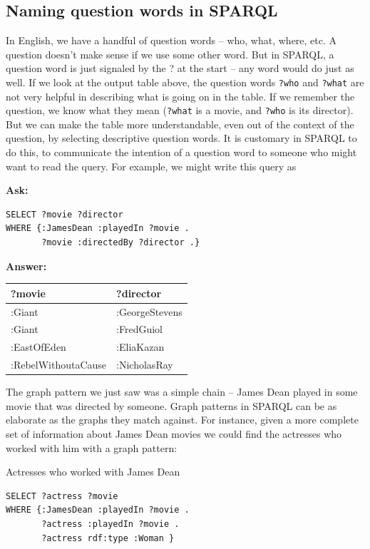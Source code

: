 \subsection{Naming question words in SPARQL}

In English, we have a handful of question words -- who, what, where,
etc. A question doesn't make sense if we use some other word. But in
SPARQL, a question word is just signaled by the ? at the start -- any
word would do just as well. If we look at the output table above, the
question words \texttt{?who} and \texttt{?what} are not very helpful in describing what is
going on in the table. If we remember the question, we know what they
mean (\texttt{?what} is a movie, and \texttt{?who} is its director). But we can make the
table more understandable, even out of the context of the question, by
selecting descriptive question words. It is customary in SPARQL to do
this, to communicate the intention of a question word to someone who
might want to read the query. For example, we might write this query as

\textbf{\textbf{Ask:}}

\begin{lstlisting}
SELECT ?movie ?director
WHERE {:JamesDean :playedIn ?movie .
       ?movie :directedBy ?director .}
\end{lstlisting}

\textbf{\textbf{Answer:}}

\begin{tabular}{|ll|}
\hline
?movie&?director\\
\hline
:Giant&:GeorgeStevens\\
:Giant&:FredGuiol\\
:EastOfEden&:EliaKazan\\
:RebelWithoutaCause&:NicholasRay\\
\hline
\end{tabular}

The graph pattern we just saw was a simple chain -- James Dean played in
some movie that was directed by someone. Graph patterns in SPARQL can be
as elaborate as the graphs they match against. For instance, given a
more complete set of information about James Dean movies we could find
the actresses who worked with him with a graph pattern:

\begin{query}Actresses who worked with James Dean\end{query}

\begin{lstlisting}
SELECT ?actress ?movie
WHERE {:JamesDean :playedIn ?movie .
       ?actress :playedIn ?movie .
       ?actress rdf:type :Woman }
\end{lstlisting}

